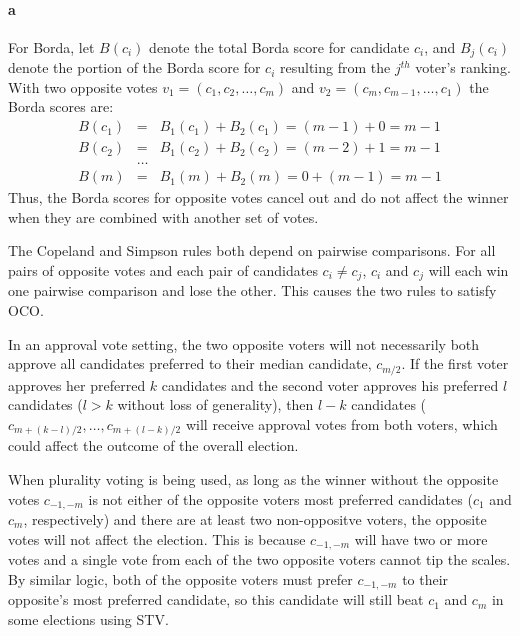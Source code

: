 \begin{answer}{1}
\paragraph{a} 


For Borda, let $B(c_i)$ denote the total Borda score for candidate $c_i$, and $B_j(c_i)$ denote the portion of the Borda score for $c_i$ resulting from the $j^{th}$ voter's ranking. With two opposite votes $v_1=(c_1, c_2, \ldots, c_m)$ and $v_2=(c_m, c_{m-1}, \ldots, c_1)$ the Borda scores are:
\begin{eqnarray*}
B(c_1) &=& B_1(c_1) + B_2(c_1) = (m-1) + 0 = m-1 \\
B(c_2) &=& B_1(c_2) + B_2(c_2) = (m-2) + 1 = m-1 \\
&\ldots& \\
B(m) &=& B_1(m) + B_2(m) = 0 + (m-1) = m-1
\end{eqnarray*}
Thus, the Borda scores for opposite votes cancel out and do not affect the winner when they are combined with another set of votes.

The Copeland and Simpson rules both depend on pairwise comparisons. For all pairs of opposite votes and each pair of candidates $c_i \neq c_j$, $c_i$ and $c_j$ will each win one pairwise comparison and lose the other. This causes the two rules to satisfy OCO. 



In an approval vote setting, the two opposite voters will not necessarily both approve all candidates preferred to their median candidate, $c_{m/2}$. If the first voter approves her preferred $k$ candidates and the second voter approves his preferred $l$ candidates ($l>k$ without loss of generality), then $l-k$ candidates ($c_{m+(k-l)/2}, \ldots, c_{m+(l-k)/2}$ will receive approval votes from both voters, which could affect the outcome of the overall election. 

When plurality voting is being used, as long as the winner without the opposite votes $c_{-1,-m}$ is not either of the opposite voters most preferred candidates ($c_1$ and $c_m$, respectively) and there are at least two non-oppositve voters, the opposite votes will not affect the election. This is because $c_{-1,-m}$ will have two or more votes and a single vote from each of the two opposite voters cannot tip the scales. By similar logic, both of the opposite voters must prefer $c_{-1,-m}$ to their opposite's most preferred candidate, so this candidate will still beat $c_1$ and $c_m$ in some elections using STV.



\end{answer}
